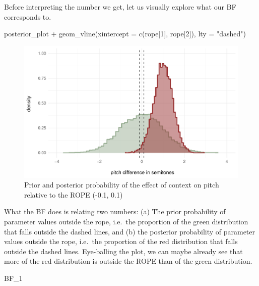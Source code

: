 \documentclass[
  doc,
  longtable,
  nolmodern,
  notxfonts,
  notimes,
  colorlinks=true,linkcolor=blue,citecolor=blue,urlcolor=blue]{apa7}
\newenvironment{Shaded}{\begin{snugshade}}{\end{snugshade}}
\newcommand{\AttributeTok}[1]{\textcolor[rgb]{0.40,0.45,0.13}{#1}}
\newcommand{\DecValTok}[1]{\textcolor[rgb]{0.68,0.00,0.00}{#1}}
\newcommand{\FunctionTok}[1]{\textcolor[rgb]{0.28,0.35,0.67}{#1}}
\newcommand{\NormalTok}[1]{\textcolor[rgb]{0.00,0.23,0.31}{#1}}
\newcommand{\SpecialCharTok}[1]{\textcolor[rgb]{0.37,0.37,0.37}{#1}}
\newcommand{\StringTok}[1]{\textcolor[rgb]{0.13,0.47,0.30}{#1}}
\begin{document}
Before interpreting the number we get, let us visually explore what our
BF corresponds to.

\begin{Shaded}
\begin{Highlighting}[]
\NormalTok{posterior\_plot }\SpecialCharTok{+} 
  \FunctionTok{geom\_vline}\NormalTok{(}\AttributeTok{xintercept =} \FunctionTok{c}\NormalTok{(rope[}\DecValTok{1}\NormalTok{], rope[}\DecValTok{2}\NormalTok{]),}
             \AttributeTok{lty =} \StringTok{"dashed"}\NormalTok{)}
\end{Highlighting}
\end{Shaded}

\begin{figure}[H]

\caption{Prior and posterior probability of the effect of context on
pitch relative to the ROPE (-0.1, 0.1)}

{\centering \includegraphics{manuscript_files/figure-pdf/plot-ropes-1.pdf}

}

\end{figure}%

What the BF does is relating two numbers: (a) The prior probability of
parameter values outside the rope, i.e.~the proportion of the green
distribution that falls outside the dashed lines, and (b) the posterior
probability of parameter values outside the rope, i.e.~the proportion of
the red distribution that falls outside the dashed lines. Eye-balling
the plot, we can maybe already see that more of the red distribution is
outside the ROPE than of the green distribution.

\begin{Shaded}
\begin{Highlighting}[]
\NormalTok{BF\_1}
\end{Highlighting}
\end{Shaded}
\end{document}
